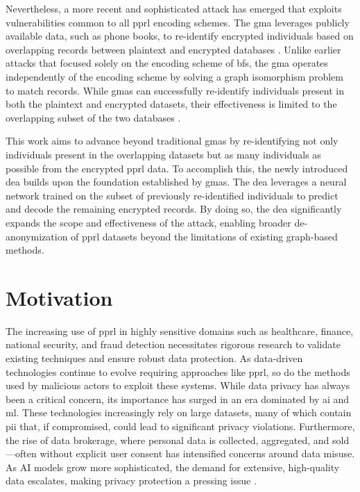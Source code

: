 Nevertheless, a more recent and sophisticated attack has emerged that exploits vulnerabilities common to all \ac{pprl} encoding schemes. 
The \ac{gma} leverages publicly available data, such as phone books, to re-identify encrypted individuals based on overlapping records between plaintext and encrypted databases \cite{vidanage2020graph, schaefer2024}. 
Unlike earlier attacks that focused solely on the encoding scheme of \ac{bf}s, the \ac{gma} operates independently of the encoding scheme by solving a graph isomorphism problem to match records. 
While \ac{gma}s can successfully re-identify individuals present in both the plaintext and encrypted datasets, their effectiveness is limited to the overlapping subset of the two databases \cite{schaefer2024}.

This work aims to advance beyond traditional \ac{gma}s by re-identifying not only individuals present in the overlapping datasets but as many individuals as possible from the encrypted \ac{pprl} data. 
To accomplish this, the newly introduced \ac{dea} builds upon the foundation established by \ac{gma}s. 
The \ac{dea} leverages a neural network trained on the subset of previously re-identified individuals to predict and decode the remaining encrypted records. 
By doing so, the \ac{dea} significantly expands the scope and effectiveness of the attack, enabling broader de-anonymization of \ac{pprl} datasets beyond the limitations of existing graph-based methods.


\section{Motivation}  \label{sec:motivation}
The increasing use of \ac{pprl} in highly sensitive domains such as healthcare, finance, national security, and fraud detection necessitates rigorous research to validate existing techniques and ensure robust data protection. 
As data-driven technologies continue to evolve requiring approaches like \ac{pprl}, so do the methods used by malicious actors to exploit these systems.
While data privacy has always been a critical concern, its importance has surged in an era dominated by \ac{ai} and \ac{ml}. 
These technologies increasingly rely on large datasets, many of which contain \ac{pii} that, if compromised, could lead to significant privacy violations. 
Furthermore, the rise of data brokerage, where personal data is collected, aggregated, and sold—often without explicit user consent has intensified concerns around data misuse. 
As AI models grow more sophisticated, the demand for extensive, high-quality data escalates, making privacy protection a pressing issue \cite{ldc2024,cacgroup2024,arxiv2024}.

